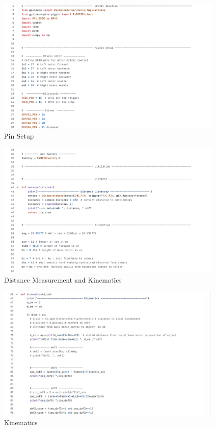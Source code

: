 
\vspace{1cm}
\begin{figure}[h]
    \centering
    \includegraphics[width=1\linewidth]{Graphics/1pin_assign.jpg}
    \caption{Pin Setup}
    \label{fig:enter-label}
\end{figure}
\begin{figure}[h]
    \centering
    \includegraphics[width=1\linewidth]{Graphics/2distanceMeasurement.jpg}
    \caption{Distance Measurement and Kinematics}
    \label{fig:enter-label}
\end{figure}
\begin{figure}[h]
    \centering
    \includegraphics[width=1\linewidth]{Graphics/3kinematics.jpg}
    \caption{Kinematics}
    \label{fig:enter-label}
\end{figure}
